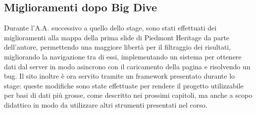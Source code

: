 	\subsection{Miglioramenti dopo Big Dive}
	Durante l'A.A. successivo a quello dello stage, sono stati effettuati dei miglioramenti alla mappa della prima slide di Piedmont Heritage da parte dell'autore, permettendo una maggiore libertà per il filtraggio dei risultati, migliorando la navigazione tra di essi, implementando un sistema per ottenere dati dal server in modo asincrono con il caricamento della pagina e risolvendo un bug.
	Il sito inoltre è ora servito tramite un framework presentato durante lo stage: queste modifiche sono state effettuate per rendere il progetto utilizzabile per basi di dati più grosse, come descritto nei prossimi capitoli, ma anche a scopo didattico in modo da utilizzare altri strumenti presentati nel corso.
